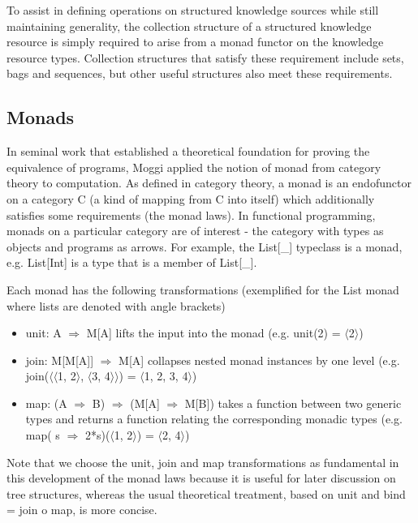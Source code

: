 \documentclass[runningheads]{llncs}
\begin{document}
To assist in defining operations on structured knowledge sources while still maintaining generality, the collection structure of a structured knowledge resource is simply required to arise from a monad functor on the knowledge resource types. Collection structures that satisfy these requirement include sets, bags and sequences, but other useful structures also meet these requirements.

\subsection{Monads}
In seminal work that established a theoretical foundation for proving the equivalence of programs, Moggi applied the notion of monad from category theory to computation.
As defined in category theory, a monad  is an endofunctor on a category C (a kind of mapping from C into itself) which additionally satisfies some requirements (the monad laws).
In functional programming, monads on a particular category are of interest - the category with types as objects and programs as arrows.
For example, the List[\_] typeclass is a monad, e.g. List[Int] is a type that is a member of List[\_].

Each monad has the following transformations (exemplified for the List monad where lists are denoted with angle brackets)
\begin{itemize}
\item unit: A $\Rightarrow$ M[A] lifts the input into the monad (e.g. unit(2) = $\langle$2$\rangle$)
\item join: M[M[A]] $\Rightarrow$ M[A] collapses nested monad instances by one level (e.g. join($\langle$$\langle$1, 2$\rangle$, $\langle$3, 4$\rangle$$\rangle$) = $\langle$1, 2, 3, 4$\rangle$)
\item map: (A $\Rightarrow$ B) $\Rightarrow$ (M[A] $\Rightarrow$ M[B]) takes a function between two generic types and returns a function relating the corresponding monadic types (e.g. map( s $\Rightarrow$ 2*s)($\langle$1, 2$\rangle$) = $\langle$2, 4$\rangle$)
\end{itemize}
Note that we choose the unit, join and map transformations as fundamental in this development of the monad laws because it is useful for later discussion on tree structures, whereas the usual theoretical treatment, based on unit and bind = join o map, is more concise.
\end{document}
